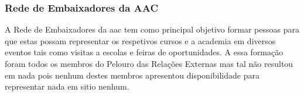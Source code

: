
\subsubsection{Rede de Embaixadores da AAC}

A Rede de Embaixadores da \acrshort{aac} tem como principal objetivo formar pessoas para que estas possam representar os respetivos cursos e a academia em diversos eventos tais como visitas a escolas e feiras de oportunidades. A essa formação foram todos os membros do Pelouro das Relações Externas mas tal não resultou em nada pois nenhum destes membros apresentou disponibilidade para representar nada em sitio nenhum.